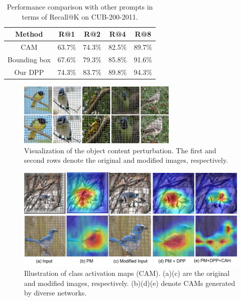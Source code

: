 \documentclass[letterpaper]{article} %
\begin{document}
\begin{table}\centering

\begin{tabular}{c||cccc}
\hline \hline
Method & R@1 & R@2 & R@4 & R@8 \\
\hline
CAM & 63.7\% & 74.3\% & 82.5\%  &89.7\% \\
Bounding box & 67.6\% & 79.3\%& 85.8\%& 91.6\% \\
\hline
Our DPP &74.3\% & 83.7\% & 89.8\% &94.3\% \\
\hline \hline
\end{tabular}
\caption{Performance comparison with other prompts in terms of Recall@K on CUB-200-2011.}
\end{table}




\begin{figure}[!t]
\centering



\includegraphics[width =0.9 0.9\linewidth,height=1.18in ]{sample.png}
\caption{Visualization of the object content perturbation. The first and second rows denote the original and modified images, respectively.}

\end{figure}
\begin{figure}[!t]
\centering
\includegraphics[width = 0.9\linewidth]{sam.png}
\caption{ Illustration of class activation maps (CAM). (a)(c) are the original and modified images, respectively. (b)(d)(e) denote CAMs generated by diverse networks.}


\end{figure}
\end{document}

